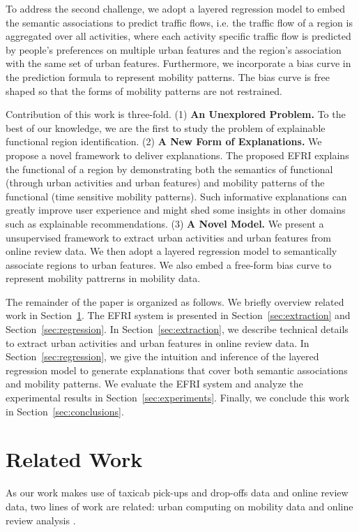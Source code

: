 \documentclass[runningheads]{llncs}
\begin{document}
To address the second challenge, we adopt a layered regression model to embed the semantic associations to predict traffic flows, i.e. the traffic flow of a region is aggregated over all activities, where each activity specific traffic flow is predicted by people's preferences on multiple urban features and the region's association with the same set of urban features.
Furthermore, we incorporate a bias curve in the prediction formula to represent mobility patterns. 
The bias curve is free shaped so that the forms of mobility patterns are not restrained.

Contribution of this work is three-fold. (1) \textbf{An Unexplored Problem.} To the best of our knowledge, we are the first to study the problem of explainable functional region identification. (2) \textbf{A New Form of Explanations.} We propose a novel framework to deliver explanations. The proposed EFRI explains the functional of a region by demonstrating both the semantics of functional (through urban activities and urban features) and mobility patterns of the functional (time sensitive mobility patterns). Such informative explanations can greatly improve user experience and might shed some insights in other domains such as explainable recommendations. (3) \textbf{A Novel Model.} We present a unsupervised framework to extract urban activities and urban features from online review data. We then adopt a layered regression model to semantically associate regions to urban features. We also embed a free-form bias curve to represent mobility pattrerns in mobility data.   

The remainder of the paper is organized as follows.
We briefly overview related work in Section~\ref{sec:related}.
The EFRI system is presented in Section~\ref{sec:extraction} and Section~\ref{sec:regression}. 
In Section~\ref{sec:extraction}, we describe technical details to extract urban activities and urban features in online review data.
In Section~\ref{sec:regression}, we give the intuition and inference of the layered regression model to generate explanations that cover both semantic associations and mobility patterns.
We evaluate the EFRI system and analyze the experimental results in Section~\ref{sec:experiments}.
Finally, we conclude this work in Section~\ref{sec:conclusions}.

\section{Related Work}\label{sec:related}
As our work makes use of taxicab pick-ups and drop-offs data and online review data, two lines of work are related: urban computing on mobility data and online review analysis .
\end{document}
